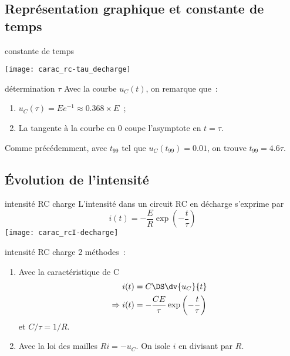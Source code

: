 \documentclass[../main/main.tex]{subfiles}
\begin{document}
\subsection{Représentation graphique et constante de temps}
\begin{tcbraster}[raster columns=2, raster equal height=rows]
    \begin{impl}[label=impl:tauRC]{constante de temps}
        \begin{center}
            \texttt{[image: carac\_rc-tau\_decharge]}
        \end{center}
    \end{impl}
    \begin{exem}[label=impl:déterm]{détermination $\tau$}
        Avec la courbe $u_C(t)$, on remarque que~:
        \begin{enumerate}
            \item $u_C(\tau) = E e^{-1} \approx \num{0.368}\times E$~;
            \item La tangente à la courbe en 0 coupe l'asymptote en
                $t = \tau$.
        \end{enumerate}
        Comme précédemment, avec $t_{99}$ tel que $u_C(t_{99}) = \num{0.01}$, on
        trouve $t_{99} = \num{4.6}\tau$.
    \end{exem}
\end{tcbraster}

\subsection{Évolution de l'intensité}

\begin{tcbraster}[raster columns=2, raster equal height=rows]
    \begin{prop}[label=prop:irc-charge, sidebyside,
        righthand width=.15\linewidth]{intensité RC charge}
        L'intensité dans un circuit RC en décharge s'exprime par
        \[\boxed{i(t) = -\frac{E}{R}\exp \left(-\frac{t}{\tau} \right)}\]
        \tcblower
        \hspace*{-12pt}\texttt{[image: carac\_rcI-decharge]}
    \end{prop}
    \begin{demo}[label=demo:irc-charge]{intensité RC charge}
        2 méthodes~:
        \begin{enumerate}
            \item Avec la caractéristique de C
                \begin{align*}
                                i(t) &= C\DS \dv{u_C}{t}\\
                    \Rightarrow i(t) &= - \frac{CE}{\tau} \exp \left(-
                    \frac{t}{\tau} \right)
                \end{align*}
                et $C/\tau = 1/R$.
            \item Avec la loi des mailles $Ri = -u_C$. On isole $i$ en
                divisant par $R$.
        \end{enumerate}
    \end{demo}
\end{tcbraster}
\end{document}
